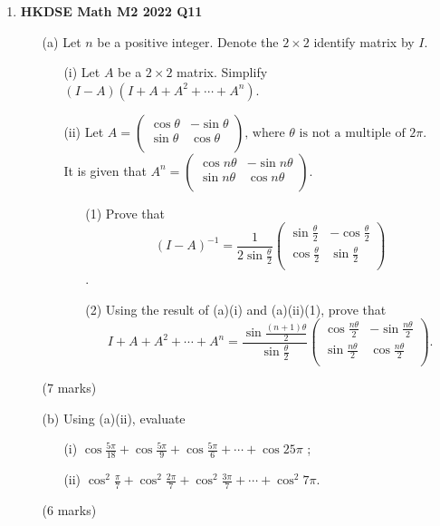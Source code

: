 \documentclass{report}
\begin{document}
\begin{enumerate}
	\item \textbf{HKDSE Math M2 2022 Q11}
	\begin{enumerate}
		\item [(a)] Let $n$ be a positive integer. Denote the $2\times2$ identify matrix by $I$. 
		\begin{enumerate}
			\item [(i)] Let $A$ be a $2\times2$ matrix. Simplify $(I - A)(I + A + A^2 + \cdots + A^n)$.
			\item [(ii)]Let $A = 
				\begin{pmatrix}
				\cos{\theta}&-\sin{\theta}\\
				\sin{\theta}&\cos{\theta}\\
				\end{pmatrix} \text{, 
				where } \theta \text{ is not a multiple of } 2\pi$.\\
				It is given that $A^n = 
				\begin{pmatrix}
				\cos{n\theta}&-\sin{n\theta}\\
				\sin{n\theta}&\cos{n\theta}\\
				\end{pmatrix}$. 
			\begin{enumerate}
				\item [(1)] Prove that $$\displaystyle(I - A) ^{-1} = \frac{1}{2\sin{\displaystyle\frac{\theta}{2}}} 
					\begin{pmatrix}
						\sin{\displaystyle\frac{\theta}{2}}&-\cos{\displaystyle\frac{\theta}{2}}\\
						\cos{\displaystyle\frac{\theta}{2}}&\sin{\displaystyle\frac{\theta}{2}}\\
					\end{pmatrix}$$.
				\item[(2)] Using the result of (a)(i) and (a)(ii)(1), prove that $$I+A+A^2+\cdots+A^n = \displaystyle\frac{\sin{\displaystyle\frac{(n+1)\theta}{2}}}{\sin{\displaystyle\frac{\theta}{2}}}
					\begin{pmatrix}
						\cos{\displaystyle\frac{n\theta}{2}}&-\sin{\displaystyle\frac{n\theta}{2}}\\
						\sin{\displaystyle\frac{n\theta}{2}}&\cos{\displaystyle\frac{n\theta}{2}}\\
					\end{pmatrix}.$$
			\end{enumerate}
		\end{enumerate}
		(7 marks)
		\item[(b)]Using (a)(ii), evaluate
		\begin{enumerate}
			\item [(i)]$\cos{\displaystyle\frac{5\pi}{18}}+\cos{\displaystyle\frac{5\pi}{9}}+\cos{\displaystyle\frac{5\pi}{6}}+\cdots+\cos{25\pi}$ ; 
			\item [(ii)]$\cos^2{\displaystyle\frac{\pi}{7}}+\cos^2{\displaystyle\frac{2\pi}{7}}+\cos^2{\displaystyle\frac{3\pi}{7}}+\cdots+\cos^2{7\pi}$. 
		\end{enumerate}
	(6 marks)
	\end{enumerate}


\end{enumerate}
\end{document}
